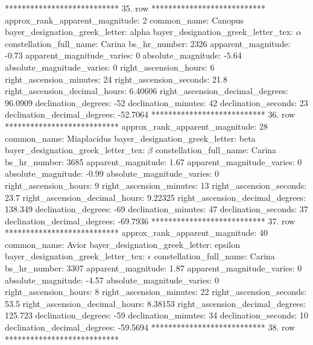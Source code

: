 *************************** 35. row ***************************
    approx_rank_apparent_magnitude: 2
                       common_name: Canopus
    bayer_designation_greek_letter: alpha
bayer_designation_greek_letter_tex: $\alpha$
           constellation_full_name: Carina
                      bs_hr_number: 2326
                apparent_magnitude: -0.73
         apparent_magnitude_varies: 0
                absolute_magnitude: -5.64
         absolute_magnitude_varies: 0
             right_ascension_hours: 6
           right_ascension_minutes: 24
           right_ascension_seconds: 21.8
     right_ascension_decimal_hours: 6.40606
   right_ascension_decimal_degrees: 96.0909
               declination_degrees: -52
               declination_minutes: 42
               declination_seconds: 23
       declination_decimal_degrees: -52.7064
*************************** 36. row ***************************
    approx_rank_apparent_magnitude: 28
                       common_name: Miaplacidus
    bayer_designation_greek_letter: beta
bayer_designation_greek_letter_tex: $\beta$
           constellation_full_name: Carina
                      bs_hr_number: 3685
                apparent_magnitude: 1.67
         apparent_magnitude_varies: 0
                absolute_magnitude: -0.99
         absolute_magnitude_varies: 0
             right_ascension_hours: 9
           right_ascension_minutes: 13
           right_ascension_seconds: 23.7
     right_ascension_decimal_hours: 9.22325
   right_ascension_decimal_degrees: 138.349
               declination_degrees: -69
               declination_minutes: 47
               declination_seconds: 37
       declination_decimal_degrees: -69.7936
*************************** 37. row ***************************
    approx_rank_apparent_magnitude: 40
                       common_name: Avior
    bayer_designation_greek_letter: epsilon
bayer_designation_greek_letter_tex: $\epsilon$
           constellation_full_name: Carina
                      bs_hr_number: 3307
                apparent_magnitude: 1.87
         apparent_magnitude_varies: 0
                absolute_magnitude: -4.57
         absolute_magnitude_varies: 0
             right_ascension_hours: 8
           right_ascension_minutes: 22
           right_ascension_seconds: 53.5
     right_ascension_decimal_hours: 8.38153
   right_ascension_decimal_degrees: 125.723
               declination_degrees: -59
               declination_minutes: 34
               declination_seconds: 10
       declination_decimal_degrees: -59.5694
*************************** 38. row ***************************
